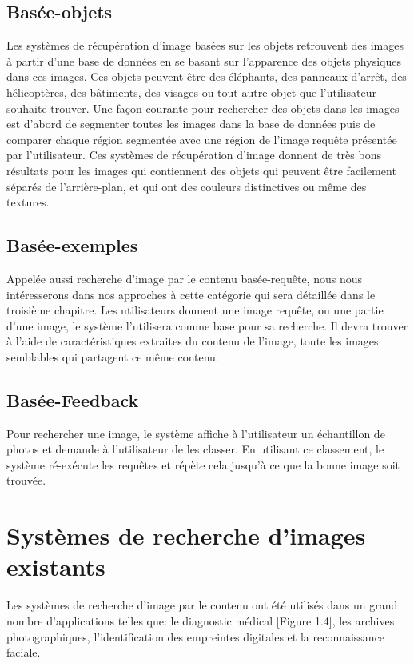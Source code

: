 \subsection{Basée-objets}
	
	Les systèmes de récupération d'image basées sur les objets retrouvent des images à partir d'une base de données en se basant sur l'apparence des objets physiques dans ces images. Ces objets peuvent être des éléphants, des panneaux d'arrêt, des hélicoptères, des bâtiments, des visages ou tout autre objet que l'utilisateur souhaite trouver. Une façon courante pour rechercher des objets dans les images est d'abord de segmenter toutes les images dans la base de données puis de comparer chaque région segmentée avec une région de l'image requête présentée par l'utilisateur. Ces systèmes de récupération d'image donnent de très bons résultats pour les images qui contiennent des objets qui peuvent être facilement séparés de l'arrière-plan, et qui ont des couleurs distinctives ou même des textures.

\subsection{Basée-exemples}

	Appelée aussi recherche d'image par le contenu basée-requête, nous nous intéresserons dans nos approches à cette catégorie qui sera détaillée dans le troisième chapitre. Les utilisateurs donnent une image requête, ou une partie d'une image, le système l'utilisera comme base pour sa recherche. Il devra trouver à l'aide de caractéristiques extraites du contenu de l'image, toute les images semblables qui partagent ce même contenu.


\subsection{Basée-Feedback}
	Pour rechercher une image, le système affiche à l'utilisateur un échantillon de photos et demande à l'utilisateur de les classer. En utilisant ce classement, le système ré-exécute les requêtes et répète cela jusqu'à ce que la bonne image soit trouvée.

\section{Systèmes de recherche d'images existants}

	Les systèmes de recherche d'image par le contenu ont été utilisés dans un grand nombre d'applications telles que: le diagnostic médical [Figure 1.4], les archives photographiques, l'identification des empreintes digitales et la reconnaissance faciale.


